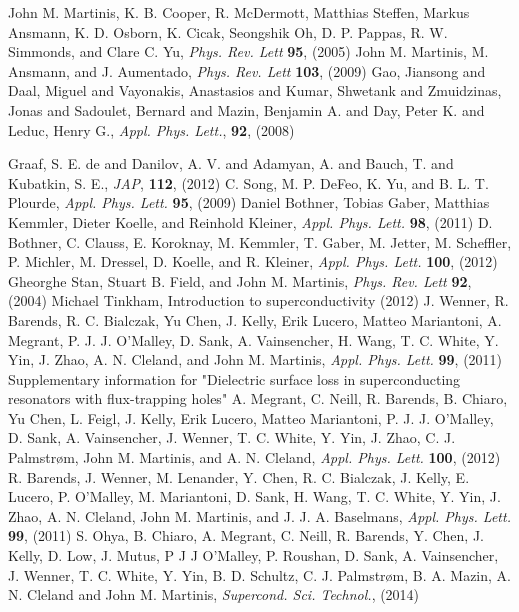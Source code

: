 \documentclass{report}
\begin{document}
\begin{thebibliography}{99}
John M. Martinis, K. B. Cooper, R. McDermott, Matthias Steffen, Markus Ansmann, K. D. Osborn, K. Cicak, Seongshik Oh, D. P. Pappas, R. W. Simmonds, and Clare C. Yu, \textit{Phys. Rev. Lett} \textbf{95}, (2005)
 John M. Martinis, M. Ansmann, and J. Aumentado, \textit{Phys. Rev. Lett} \textbf{103}, (2009)
 Gao, Jiansong and Daal, Miguel and Vayonakis, Anastasios and Kumar, Shwetank and Zmuidzinas, Jonas and Sadoulet, Bernard and Mazin, Benjamin A. and Day, Peter K. and Leduc, Henry G., \textit{Appl. Phys. Lett.}, \textbf{92}, (2008)

 Graaf, S. E. de and Danilov, A. V. and Adamyan, A. and Bauch, T. and Kubatkin, S. E., \textit{JAP}, \textbf{112},  (2012)
 C.  Song, M. P.  DeFeo, K.  Yu, and B. L. T.  Plourde, \textit{Appl. Phys. Lett.} \textbf{95},  (2009)
  Daniel Bothner,  Tobias Gaber,  Matthias Kemmler,  Dieter Koelle, and  Reinhold Kleiner, \textit{Appl. Phys. Lett.} \textbf{98},  (2011)
 D.  Bothner, C.  Clauss, E.  Koroknay, M.  Kemmler, T.  Gaber, M.  Jetter, M.  Scheffler, P.  Michler, M.  Dressel, D.  Koelle, and R.  Kleiner, \textit{Appl. Phys. Lett.} \textbf{100},  (2012)
  Gheorghe Stan,  Stuart B. Field, and  John M. Martinis, \textit{Phys. Rev. Lett} \textbf{92},  (2004)
Michael Tinkham, Introduction to superconductivity (2012)
 J.  Wenner, R.  Barends, R. C.  Bialczak,  Yu Chen, J.  Kelly,  Erik Lucero,  Matteo Mariantoni, A.  Megrant, P. J. J.  O’Malley, D.  Sank, A.  Vainsencher, H.  Wang, T. C.  White, Y.  Yin, J.  Zhao, A. N.  Cleland, and  John M. Martinis, \textit{Appl. Phys. Lett.} \textbf{99},  (2011)
Supplementary information for "Dielectric surface loss in superconducting resonators with flux-trapping holes"
 A.  Megrant, C.  Neill, R.  Barends, B.  Chiaro,  Yu Chen, L.  Feigl, J.  Kelly,  Erik Lucero,  Matteo Mariantoni, P. J. J.  O’Malley, D.  Sank, A.  Vainsencher, J.  Wenner, T. C.  White, Y.  Yin, J.  Zhao, C. J.  Palmstrøm,  John M. Martinis, and A. N.  Cleland, \textit{Appl. Phys. Lett.} \textbf{100},  (2012)
 R.  Barends, J.  Wenner, M.  Lenander, Y.  Chen, R. C.  Bialczak, J.  Kelly, E.  Lucero, P.  O’Malley, M.  Mariantoni, D.  Sank, H.  Wang, T. C.  White, Y.  Yin, J.  Zhao, A. N.  Cleland,  John M. Martinis, and J. J. A.  Baselmans, \textit{Appl. Phys. Lett.} \textbf{99},  (2011)
 S. Ohya, B. Chiaro, A. Megrant, C. Neill, R. Barends, Y. Chen, J. Kelly, D. Low, J. Mutus,  P J J O’Malley,  P. Roushan,  D. Sank, A. Vainsencher, J. Wenner, T. C. White, Y. Yin, B. D. Schultz, C. J. Palmstrøm, B. A. Mazin, A. N. Cleland and John M. Martinis,  \textit{Supercond. Sci. Technol.}, (2014)

\end{thebibliography}
\end{document}
